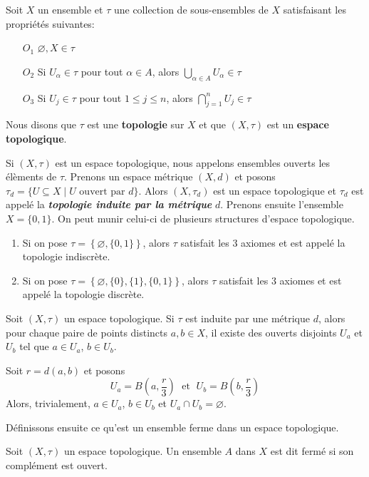 \documentclass[french]{article}
\begin{document}
\begin{definition}
  Soit $X$ un ensemble et $\tau$ une collection de sous-ensembles de $X$ satisfaisant les propriétés suivantes:
  \begin{enumerate}
    \item[$O_1$] $\varnothing, X \in \tau$
    \item[$O_2$] Si $U_\alpha \in \tau$ pour tout $\alpha \in A$, alors $\bigcup\limits_{\alpha \in A} U_\alpha \in \tau$ 
    \item[$O_3$] Si $U_j \in \tau$ pour tout $1 \leq j \leq n$, alors $\bigcap\limits_{j=1}^{n} U_j \in \tau$
  \end{enumerate}
  Nous disons que $\tau$ est une \textbf{topologie} sur $X$ et que $(X, \tau)$ est un \textbf{espace topologique}.
\end{definition}
Si $(X, \tau)$ est un espace topologique, nous appelons ensembles ouverts les élèments de $\tau$.
\newline Prenons un espace métrique $(X, d)$ et posons $\tau_d = \{U \subseteq X \mid U \text{ ouvert par } d\}$. Alors $(X, \tau_d)$ est un espace topologique et $\tau_d$ est appelé la \textbf{\it topologie induite par la métrique} $d$.
\newline Prenons ensuite l'ensemble $X = \{0, 1\}$. On peut munir celui-ci de plusieurs structures d'espace topologique.
\begin{enumerate}
  \item Si on pose $\tau = \left\{ \varnothing, \{0, 1\} \right\}$, alors $\tau$ satisfait les 3 axiomes et est appelé la topologie indiscrète.
  \item Si on pose $\tau = \left\{ \varnothing, \{0\}, \{1\}, \{0, 1\} \right\}$, alors $\tau$ satisfait les 3 axiomes et est appelé la topologie discrète.
\end{enumerate}
\begin{lemme}
  Soit $(X, \tau)$ un espace topologique. Si $\tau$ est induite par une métrique $d$, alors pour chaque paire de points distincts $a, b \in X$, il existe des ouverts disjoints $U_a$ et $U_b$ tel que $a \in U_a$, $b \in U_b$.

  \tcblower
  \begin{preuve}
    Soit $r = d(a, b)$ et posons
    $$U_a = B\left(a, \frac{r}{3} \right) \; \text{ et } \; U_b = B\left(b, \frac{r}{3}\right)$$
    Alors, trivialement, $a \in U_a$, $b \in U_b$ et $U_a \cap U_b = \varnothing$.
  \end{preuve}
\end{lemme}
Définissons ensuite ce qu'est un ensemble ferme dans un espace topologique.
\begin{definition}
  Soit $(X, \tau)$ un espace topologique. Un ensemble $A$ dans $X$ est dit fermé si son complément est ouvert.
\end{definition}
\end{document}
